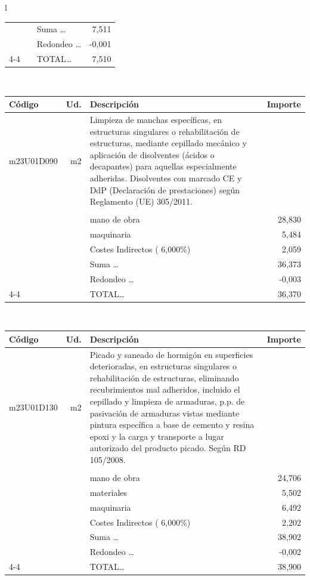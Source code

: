 \documentclass{book}%
\begin{document}
\begin{longtable}{l}
\begin{tabular}{l r p{60mm} r}
&&Suma \ldots&     7,511\\%
&&Redondeo \ldots&    {-}0,001\\%
\cline{4-4}%
&&TOTAL\ldots&     7,510\\%
\end{tabular}\\%
\begin{tabular}{l r p{60mm} r}%
Código&Ud.&Descripción&Importe\\%
\hline%
m23U01D090&m2&Limpieza de manchas específicas, en estructuras singulares o rehabilitación de estructuras, mediante cepillado mecánico y aplicación de disolventes (ácidos o decapantes) para aquellas especialmente adheridas. Disolventes con marcado CE y DdP (Declaración de prestaciones) según Reglamento (UE) 305/2011.&\\%
&&&\\%
&&mano de obra&    28,830\\%
&&maquinaria&     5,484\\%
&&Costes Indirectos (     6,000\%)&     2,059\\%
&&Suma \ldots&    36,373\\%
&&Redondeo \ldots&    {-}0,003\\%
\cline{4-4}%
&&TOTAL\ldots&    36,370\\%
\end{tabular}\\%
\begin{tabular}{l r p{60mm} r}%
Código&Ud.&Descripción&Importe\\%
\hline%
m23U01D130&m2&Picado y saneado de hormigón en superficies deterioradas, en estructuras singulares o rehabilitación de estructuras, eliminando recubrimientos mal adheridos, incluido el cepillado y limpieza de armaduras, p.p. de pasivación de armaduras vistas mediante pintura específica a base de cemento y resina epoxi y la carga y transporte a lugar autorizado del producto picado. Según RD 105/2008.&\\%
&&&\\%
&&mano de obra&    24,706\\%
&&materiales&     5,502\\%
&&maquinaria&     6,492\\%
&&Costes Indirectos (     6,000\%)&     2,202\\%
&&Suma \ldots&    38,902\\%
&&Redondeo \ldots&    {-}0,002\\%
\cline{4-4}%
&&TOTAL\ldots&    38,900\\%
\end{tabular}\\%

\end{longtable}
\end{document}

